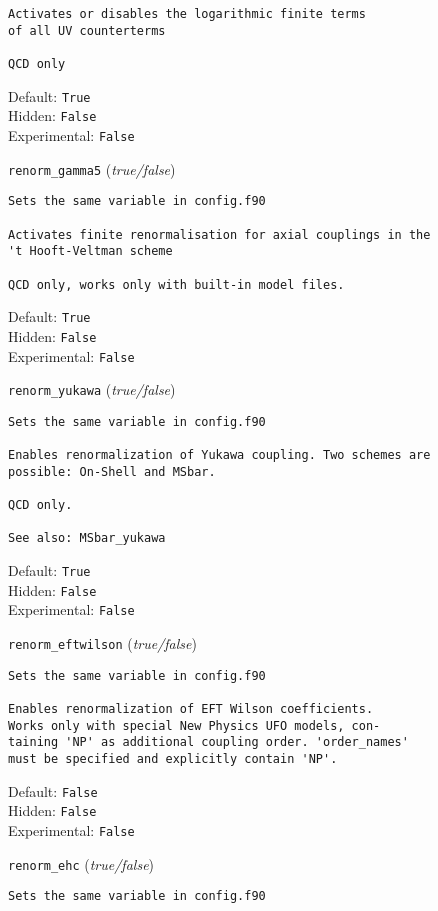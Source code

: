 \begin{basedescript}{\desclabelstyle{\pushlabel}}
\begin{verbatim}
Activates or disables the logarithmic finite terms
of all UV counterterms

QCD only
\end{verbatim}
Default: \verb|True|
\\Hidden: \verb|False|
\\Experimental: \verb|False|
\\\item[\colorbox{gray!30}{\texttt{renorm\_gamma5}}] (\textit{true/false})
\begin{verbatim}
Sets the same variable in config.f90

Activates finite renormalisation for axial couplings in the
't Hooft-Veltman scheme

QCD only, works only with built-in model files.
\end{verbatim}
Default: \verb|True|
\\Hidden: \verb|False|
\\Experimental: \verb|False|
\\\item[\colorbox{gray!30}{\texttt{renorm\_yukawa}}] (\textit{true/false})
\begin{verbatim}
Sets the same variable in config.f90

Enables renormalization of Yukawa coupling. Two schemes are
possible: On-Shell and MSbar.

QCD only.

See also: MSbar_yukawa
\end{verbatim}
Default: \verb|True|
\\Hidden: \verb|False|
\\Experimental: \verb|False|
\\\item[\colorbox{gray!30}{\texttt{renorm\_eftwilson}}] (\textit{true/false})
\begin{verbatim}
Sets the same variable in config.f90

Enables renormalization of EFT Wilson coefficients.
Works only with special New Physics UFO models, con-
taining 'NP' as additional coupling order. 'order_names'
must be specified and explicitly contain 'NP'.
\end{verbatim}
Default: \verb|False|
\\Hidden: \verb|False|
\\Experimental: \verb|False|
\\\item[\colorbox{gray!30}{\texttt{renorm\_ehc}}] (\textit{true/false})
\begin{verbatim}
Sets the same variable in config.f90


\end{verbatim}
\end{basedescript}
